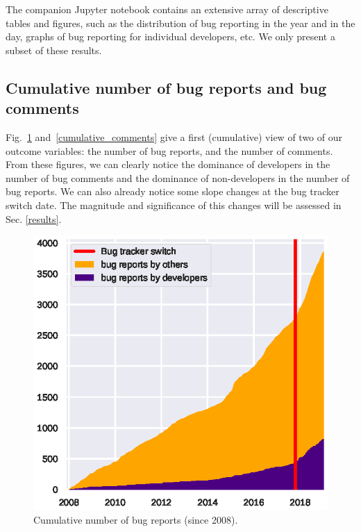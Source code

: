 \documentclass[conference]{IEEEtran}
\begin{document}
The companion Jupyter notebook contains an extensive array of descriptive tables and figures, such as the distribution of bug reporting in the year and in the day, graphs of bug reporting for individual developers, etc. We only present a subset of these results.

\subsection{Cumulative number of bug reports and bug comments}

Fig.~\ref{cumulative_bugs} and~\ref{cumulative_comments} give a first (cumulative) view of two of our outcome variables: the number of bug reports, and the number of comments. From these figures, we can clearly notice the dominance of developers in the number of bug comments and the dominance of non-developers in the number of bug reports. We can also already notice some slope changes at the bug tracker switch date. The magnitude and significance of this changes will be assessed in Sec. \ref{results}.

\begin{figure}
\includegraphics{cumulative_bugs.eps}
\caption{Cumulative number of bug reports (since 2008).} \label{cumulative_bugs}
\end{figure}
\end{document}
